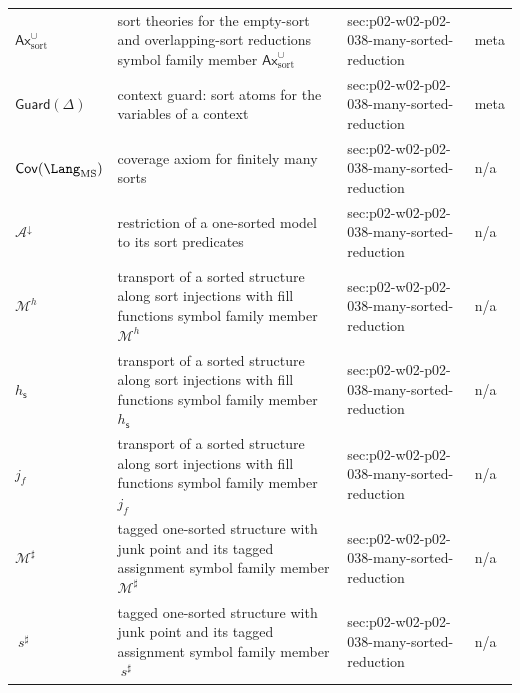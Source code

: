 \begin{longtable}{@{}p{}p{}p{}p{}@{}}
\(\mathsf{Ax}^{\cup}_{\mathrm{sort}}\) & sort theories for the empty-sort and overlapping-sort reductions symbol family member \(\mathsf{Ax}^{\cup}_{\mathrm{sort}}\) & sec:\allowbreak{}p02-\allowbreak{}w02-\allowbreak{}p02-\allowbreak{}038-\allowbreak{}many-\allowbreak{}sorted-\allowbreak{}reduction & meta \\
\(\mathsf{Guard}(\Delta)\) & context guard: sort atoms for the variables of a context & sec:\allowbreak{}p02-\allowbreak{}w02-\allowbreak{}p02-\allowbreak{}038-\allowbreak{}many-\allowbreak{}sorted-\allowbreak{}reduction & meta \\
\(\mathsf{Cov}(\Lang_{\mathrm{MS}})\) & coverage axiom for finitely many sorts & sec:\allowbreak{}p02-\allowbreak{}w02-\allowbreak{}p02-\allowbreak{}038-\allowbreak{}many-\allowbreak{}sorted-\allowbreak{}reduction & n/a \\
\(\mathcal A^{\downarrow}\) & restriction of a one-sorted model to its sort predicates & sec:\allowbreak{}p02-\allowbreak{}w02-\allowbreak{}p02-\allowbreak{}038-\allowbreak{}many-\allowbreak{}sorted-\allowbreak{}reduction & n/a \\
\(\mathcal M^{h}\) & transport of a sorted structure along sort injections with fill functions symbol family member \(\mathcal M^{h}\) & sec:\allowbreak{}p02-\allowbreak{}w02-\allowbreak{}p02-\allowbreak{}038-\allowbreak{}many-\allowbreak{}sorted-\allowbreak{}reduction & n/a \\
\(h_{\mathsf s}\) & transport of a sorted structure along sort injections with fill functions symbol family member \(h_{\mathsf s}\) & sec:\allowbreak{}p02-\allowbreak{}w02-\allowbreak{}p02-\allowbreak{}038-\allowbreak{}many-\allowbreak{}sorted-\allowbreak{}reduction & n/a \\
\(j_f\) & transport of a sorted structure along sort injections with fill functions symbol family member \(j_f\) & sec:\allowbreak{}p02-\allowbreak{}w02-\allowbreak{}p02-\allowbreak{}038-\allowbreak{}many-\allowbreak{}sorted-\allowbreak{}reduction & n/a \\
\(\mathcal M^{\sharp}\) & tagged one-sorted structure with junk point and its tagged assignment symbol family member \(\mathcal M^{\sharp}\) & sec:\allowbreak{}p02-\allowbreak{}w02-\allowbreak{}p02-\allowbreak{}038-\allowbreak{}many-\allowbreak{}sorted-\allowbreak{}reduction & n/a \\
\(\ s^{\sharp}\) & tagged one-sorted structure with junk point and its tagged assignment symbol family member \(\ s^{\sharp}\) & sec:\allowbreak{}p02-\allowbreak{}w02-\allowbreak{}p02-\allowbreak{}038-\allowbreak{}many-\allowbreak{}sorted-\allowbreak{}reduction & n/a \\

\end{longtable}

